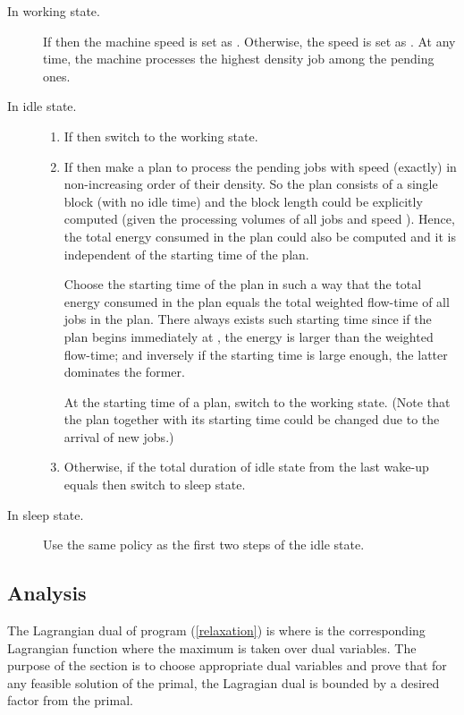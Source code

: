 \documentclass[11pt]{article}
\begin{document}
\begin{description}
\item[In working state.] If 
		then the machine speed is set as .
		Otherwise, the speed is set as .
		At any time, the machine processes the highest  density job
		among the pending ones. 
\item[In idle state.]
		\begin{enumerate}
			\item If 
			then switch to the working state.
\item If 
			then make a plan to process the pending jobs with speed (exactly) 
			in non-increasing order of their  density. So the plan consists of a single 
			block (with no idle time) and the block length could be explicitly computed (given 
			the processing volumes of all jobs and speed ). Hence, the total energy consumed in the plan 
			could also be computed and it is independent of the starting time of the plan. 
		
			Choose the starting time of the plan in such a way that the total energy consumed 
			in the plan equals the total weighted flow-time of all jobs in the plan. 
			There always exists
			such starting time since if the plan begins immediately at , the energy is larger than  
			the weighted flow-time; 
			and inversely if the starting time is large enough, the latter dominates the former.  
		
			At the starting time of a plan, switch to the working state. (Note that the plan together with 
			its starting time could be changed due to the arrival of new jobs.)
\item Otherwise, if the total duration of idle state from the last wake-up equals
				 then switch to sleep state.
		\end{enumerate}
\item[In sleep state.] Use the same policy as
		the first two steps of the idle state.   
\end{description}
  
\subsection{Analysis} 
  
The Lagrangian dual of program (\ref{relaxation}) is  
where  is the corresponding Lagrangian function where the maximum is taken over 
dual variables. The purpose of the section is to choose appropriate dual variables
and prove that for any feasible solution  of the primal, the Lagragian dual
is bounded by a desired factor from the primal. 
\end{document}
